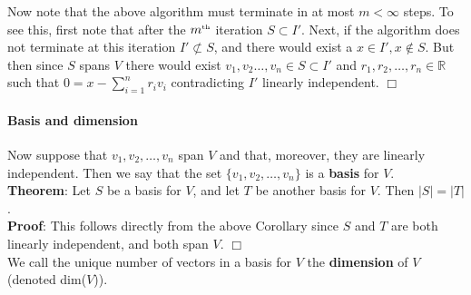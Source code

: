 \documentclass[12pt,oneside]{article}
\begin{document}
Now note that the above algorithm must terminate in at most \(m < \infty \) steps. To see this, first note that after the \(m^{\text{\tiny th}} \) iteration \( S \subset I' \). Next, if the algorithm does not terminate at this iteration \( I' \not\subset S \), and there would exist a \(x \in I', x \notin S \). But then since \( S \) spans \(V\) there would exist \(v_1,v_2\dots,v_n \in S \subset I'\) and \(r_1,r_2,\dots,r_n \in \mathbb{R} \) such that \(0=x-\sum_{i=1}^n r_iv_i \) contradicting \(I'\) linearly independent. $\Box$\\


\paragraph{Basis and dimension}
Now suppose that $v_{1}, v_{2}, \ldots, v_{n}$ span $V$ and that,
moreover, they are linearly independent. Then we say that the set $\{
v_{1}, v_{2}, \ldots, v_{n} \}$ is a \textbf{basis} for $V$.\\

\textbf{Theorem}: Let $S$ be a basis for
$V$, and let $T$ be another basis for
$V$. Then $|S| = |T|$.\\

\textbf{Proof}: This follows directly from the above Corollary since \(S\) and \(T\) are both linearly independent, and both span \(V\). $\Box$
\\


We call the unique number of vectors in a basis for $V$ the
\textbf{dimension} of $V$ (denoted dim($V$)).\\
\end{document}
